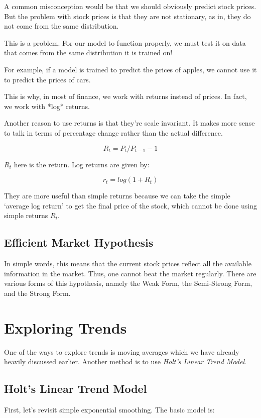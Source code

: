 A common misconception would be that we should obviously predict stock prices. But the problem with stock prices is that they are not stationary, as in, they do not come from the same distribution.

This is a problem. For our model to function properly, we must test it on data that comes from the same distribution it is trained on!

For example, if a model is trained to predict the prices of apples, we cannot use it to predict the prices of cars.

This is why, in most of finance, we work with returns instead of prices. In fact, we work with *log* returns.

Another reason to use returns is that they’re scale invariant.  It makes more sense to talk in terms of percentage change rather than the actual difference.

\[R_t = P_t /P_{t-1} - 1\]

$R_t$ here is the return. Log returns are given by:

\[r_t = log(1+R_t)\]

They are more useful than simple returns because we can take the simple ‘average log return’ to get the final price of the stock, which cannot be done using simple returns $R_t$.

\subsection{Efficient Market Hypothesis}

In simple words, this means that the current stock prices reflect all the available information in the market. Thus, one cannot beat the market regularly. There are various forms of this hypothesis, namely the Weak Form, the Semi-Strong Form, and the Strong Form.

\section{Exploring Trends}

One of the ways to explore trends is moving averages which we have already heavily discussed earlier. Another method is to use \emph{Holt's Linear Trend Model}.

\subsection{Holt's Linear Trend Model}

First, let’s revisit simple exponential smoothing. The basic model is:

